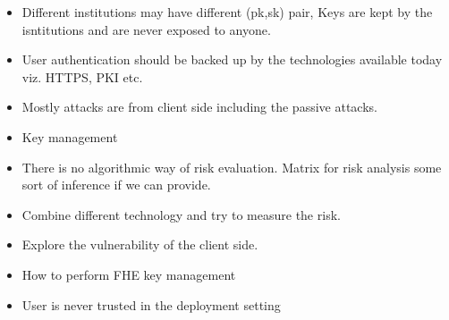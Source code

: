 \begin{itemize}
    \item Different institutions may have different (pk,sk) pair, Keys are kept by the isntitutions and are never exposed to anyone.
    \item User authentication should be backed up by the technologies available today viz. HTTPS, PKI etc.
    \item Mostly attacks are from client side including the passive attacks.
    \item Key management
    \item There is no algorithmic way of risk evaluation. Matrix for risk analysis some sort of inference if we can provide.
    \item Combine different technology and try to measure the risk.
    \item Explore the vulnerability of the client side.
    \item How to perform FHE key management
    \item User is never trusted in the deployment setting
\end{itemize}
